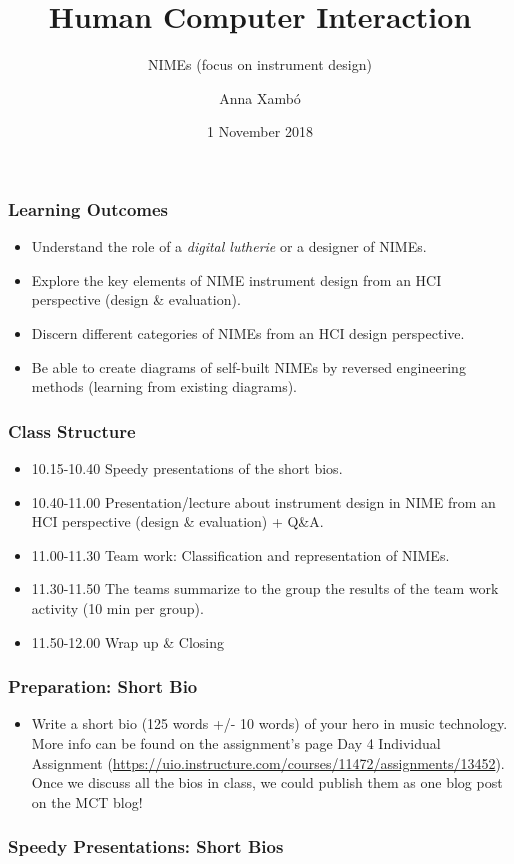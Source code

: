 \documentclass[screen, aspectratio=43]{beamer}
\title[HCI-intro]{Human Computer Interaction}
\subtitle{NIMEs (focus on instrument design)}
\author[A. Xamb{\'o}]{Anna Xamb{\'o}}
\institute[NTNU]{Department of Music, NTNU}
\date{1 November 2018}
\begin{document}
\begin{frame}
  \titlepage
\end{frame}


%
\begin{frame}
\frametitle{Learning Outcomes}
\begin{itemize}
\item Understand the role of a \emph{digital lutherie} or a designer of NIMEs.
\item Explore the key elements of NIME instrument design from an HCI perspective (design \& evaluation).
\item Discern different categories of NIMEs from an HCI design perspective.
\item Be able to create diagrams of self-built NIMEs by reversed engineering methods (learning from existing diagrams).
\end{itemize}
\end{frame}
%
\begin{frame}
\frametitle{Class Structure}
\begin{itemize}
\item 10.15-10.40 Speedy presentations of the short bios.
\item 10.40-11.00 Presentation/lecture about instrument design in NIME from an HCI perspective (design \& evaluation) + Q\&A.
\item 11.00-11.30 Team work: Classification and representation of NIMEs.
\item 11.30-11.50 The teams summarize to the group the results of the team work activity (10 min per group).
\item 11.50-12.00 Wrap up \& Closing
\end{itemize}
\end{frame}
%
\begin{frame}
\frametitle{Preparation: Short Bio}
\begin{itemize}
\item Write a short bio (125 words +/- 10 words) of your hero in music technology. More info can be found on the assignment's page Day 4 Individual Assignment (\url{https://uio.instructure.com/courses/11472/assignments/13452}). Once we discuss all the bios in class, we could publish them as one blog post on the MCT blog! 
\end{itemize}
\end{frame}
%
\begin{frame}
\frametitle{Speedy Presentations: Short Bios}
\end{frame}
\end{document}
